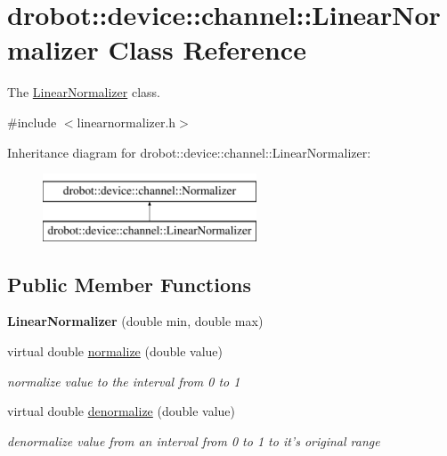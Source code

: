 \hypertarget{classdrobot_1_1device_1_1channel_1_1LinearNormalizer}{\section{drobot\-:\-:device\-:\-:channel\-:\-:Linear\-Normalizer Class Reference}
\label{classdrobot_1_1device_1_1channel_1_1LinearNormalizer}
}


The \hyperlink{classdrobot_1_1device_1_1channel_1_1LinearNormalizer}{Linear\-Normalizer} class.  




{\ttfamily \#include $<$linearnormalizer.\-h$>$}

Inheritance diagram for drobot\-:\-:device\-:\-:channel\-:\-:Linear\-Normalizer\-:\begin{figure}[H]
\begin{center}
\leavevmode
\includegraphics[height=2.000000cm]{classdrobot_1_1device_1_1channel_1_1LinearNormalizer}
\end{center}
\end{figure}
\subsection*{Public Member Functions}
\begin{DoxyCompactItemize}
\item 
\hypertarget{classdrobot_1_1device_1_1channel_1_1LinearNormalizer_a84fec2614263c8bf35ce13fad7b2fc9e}{{\bfseries Linear\-Normalizer} (double min, double max)}\label{classdrobot_1_1device_1_1channel_1_1LinearNormalizer_a84fec2614263c8bf35ce13fad7b2fc9e}

\item 
virtual double \hyperlink{classdrobot_1_1device_1_1channel_1_1LinearNormalizer_a56e9bacaecd6b5310525d60ecd1a0f5c}{normalize} (double value)
\begin{DoxyCompactList}\small\item\em normalize value to the interval from 0 to 1 \end{DoxyCompactList}\item 
virtual double \hyperlink{classdrobot_1_1device_1_1channel_1_1LinearNormalizer_a7db474fa6bcb13adb6ffa2044d512b6d}{denormalize} (double value)
\begin{DoxyCompactList}\small\item\em denormalize value from an interval from 0 to 1 to it's original range \end{DoxyCompactList}\end{DoxyCompactItemize}
